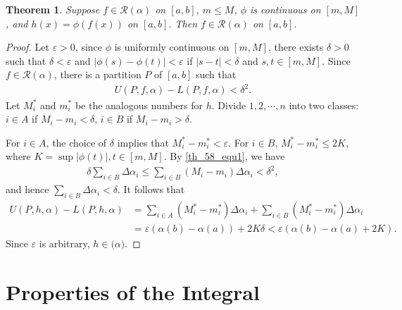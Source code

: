 \documentclass[10pt]{book}
\newtheorem{theorem}{Theorem}[chapter]
\theoremstyle{definition}
\numberwithin{equation}{chapter}
\begin{document}
\begin{theorem}\label{th_58}
Suppose $f \in \mathscr{R}(\alpha)$ on $[a,b]$, $m \leq M$, $\phi$ is continuous on $[m,M]$, and $h(x) = \phi(f(x))$ on $[a,b]$. Then $f \in \mathscr{R}(\alpha)$ on $[a,b]$.
\end{theorem}
\begin{proof}
Let $\varepsilon > 0$, since $\phi$ is uniformly continuous on $[m,M]$, there exists $\delta > 0$ such that $\delta < \varepsilon$ and $\left|\phi(s) - \phi(t)\right| < \varepsilon$ if $\left|s - t\right| < \delta$ and $s,t \in [m,M]$. Since $f \in \mathscr{R}(\alpha)$, there is a partition $P$ of $[a,b]$ such that 
\begin{align}\label{th_58_equ1}
    U(P,f,\alpha) - L(P,f,\alpha) < \delta^2.
\end{align}
Let $M^*_i$ and $m^*_i$ be the analogous numbers for $h$. Divide $1,2,\cdots,n$ into two classes: $i \in A$ if $M_i - m_i < \delta$, $i \in B$ if $M_i - m_i > \delta$.

For $i \in A$, the choice of $\delta$ implies that $M^*_i - m^*_i < \varepsilon$. For $i \in B$, $M^*_i - m^*_i \leq 2K$, where $K = \sup \left|\phi(t)\right|, t \in [m,M]$. By \eqref{th_58_equ1}, we have
\begin{align*}
    \delta \sum_{i \in B} \Delta \alpha_i \leq \sum_{i \in B} (M_i - m_i) \Delta \alpha_i < \delta^2,
\end{align*}
and hence $\sum_{i \in B} \Delta \alpha_i < \delta$. It follows that
\begin{align*}
    U(P,h,\alpha) - L(P,h,\alpha) & = \sum_{i \in A} (M^*_i - m^*_i) \Delta \alpha_i + \sum_{i \in B} (M^*_i - m^*_i) \Delta \alpha_i \\
    & = \varepsilon \left(\alpha(b) - \alpha(a)\right) + 2K\delta < \varepsilon \left(\alpha(b) - \alpha(a) + 2K\right).
\end{align*}
Since $\varepsilon$ is arbitrary, $h \in \mathscr(\alpha)$.
\end{proof}

\medskip



\section{Properties of the Integral}
\end{document}
